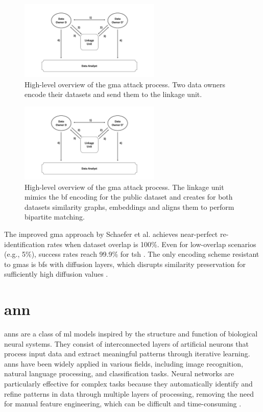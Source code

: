 \begin{figure}[H]
  \centering
  \includegraphics[width=0.6\textwidth, page=10]{img/visualization.pdf}
  \caption{High-level overview of the \ac{gma} attack process.
  Two data owners encode their datasets and send them to the linkage unit.}
  \label{fig:gmaexampleone}
\end{figure}

\begin{figure}[H]
  \centering
  \includegraphics[width=0.6\textwidth, page=11]{img/visualization.pdf}
  \caption{High-level overview of the \ac{gma} attack process.
  The linkage unit mimics the \ac{bf} encoding for the public dataset and creates for both datasets similarity graphs, embeddings and aligns them to perform bipartite matching.}
  \label{fig:gmaexampletwo}
\end{figure}

The improved \ac{gma} approach by Schaefer et al. \cite{schaefer2024} achieves near-perfect re-identification rates when dataset overlap is 100\%.
Even for low-overlap scenarios (e.g., 5\%), success rates reach 99.9\% for \ac{tsh} \cite{schaefer2024}.
The only encoding scheme resistant to \ac{gma}s is \ac{bf}s with diffusion layers, which disrupts similarity preservation for sufficiently high diffusion values \cite{schaefer2024}.


\section{\ac{ann}} \label{sec:nn}

\ac{ann}s are a class of \ac{ml} models inspired by the structure and function of biological neural systems.
They consist of interconnected layers of artificial neurons that process input data and extract meaningful patterns through iterative learning.
\ac{ann}s have been widely applied in various fields, including image recognition, natural language processing, and classification tasks.
Neural networks are particularly effective for complex tasks because they automatically identify and refine patterns in data through multiple layers of processing, removing the need for manual feature engineering, which can be difficult and time-consuming \cite{dongare2012introduction}.

